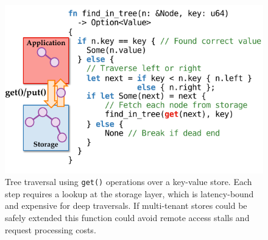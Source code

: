 \begin{figure}[t]
\centering
\includegraphics[width=1.0\columnwidth]{figures/sandstorm-tree-traversal.pdf}
\caption{Tree traversal using \texttt{get()} operations over a key-value
	store. Each step requires a lookup at the
	storage layer, which is latency-bound and expensive for deep traversals.
  If multi-tenant stores could be safely extended this function could avoid
  remote access stalls and request processing costs.}
\label{fig:kv-tree-traversal}
\end{figure}
